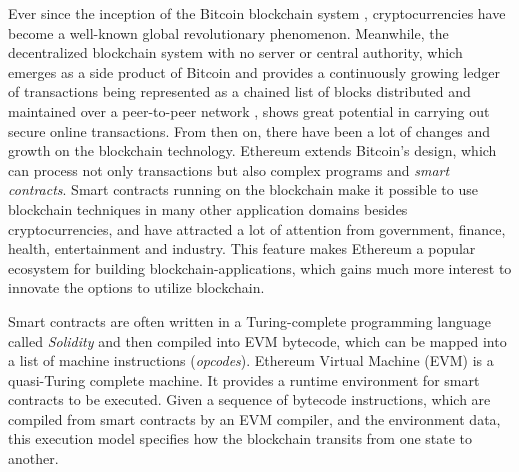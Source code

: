 \documentclass[runningheads]{llncs}
\begin{document}
Ever since the inception of the Bitcoin blockchain system \cite{nakamoto2008bitcoin}, 
cryptocurrencies have become a well-known global revolutionary phenomenon. 
Meanwhile, the decentralized blockchain system with no server or central authority, which emerges as a side product of Bitcoin 
and provides a continuously growing ledger of transactions being represented as a chained list of blocks distributed 
and maintained over a peer-to-peer network \cite{ZXDCW18}, shows great potential in carrying out secure online transactions. 
From then on, there have been a lot of changes and growth on the blockchain technology. %
Ethereum \cite{Ethereum} extends Bitcoin's design, which can process not only transactions but also complex programs and {\em smart contracts}. 
Smart contracts running on the blockchain 
make it possible to use blockchain techniques in many other application domains besides cryptocurrencies, 
and have attracted a lot of attention from government, finance, health, entertainment and industry. This feature makes Ethereum a popular ecosystem for building blockchain-applications, which gains much more interest to innovate the options to utilize blockchain. 

Smart contracts are often written in a Turing-complete programming language called \textit{Solidity} \cite{solidity} 
and then compiled into EVM bytecode, which can be mapped into a list of machine instructions (\textit{opcodes}).  
Ethereum Virtual Machine (EVM) is a quasi-Turing complete machine. 
It provides a runtime environment for smart contracts to be executed. 
Given a sequence of bytecode instructions, which are compiled from smart contracts by an EVM compiler, and the environment data, this execution model specifies how the blockchain transits from one state to another. 
\end{document}
